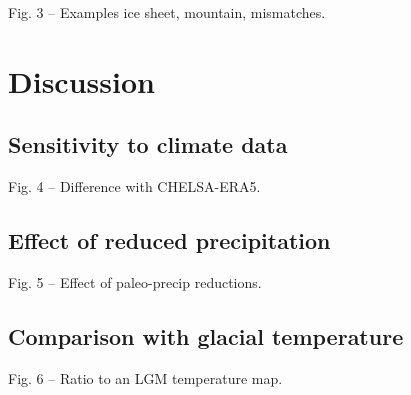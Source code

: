 \documentclass[manuscript]{copernicus}
\begin{document}
    Fig. 3 -- Examples ice sheet, mountain, mismatches.

\section{Discussion}

\subsection{Sensitivity to climate data}

    Fig. 4 -- Difference with CHELSA-ERA5.

\subsection{Effect of reduced precipitation}

    Fig. 5 -- Effect of paleo-precip reductions.

\subsection{Comparison with glacial temperature}

    Fig. 6 -- Ratio to an LGM temperature map.


\end{document}
